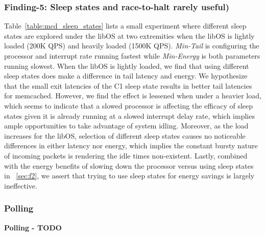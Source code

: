 \subsubsection{Finding-5: Sleep states and race-to-halt rarely useful)} \label{sec:f5} 
Table~\ref{table:mcd_sleep_states} lists a small experiment where different sleep states are explored under the libOS at two extremities when the libOS is lightly loaded (200K QPS) and heavily loaded (1500K QPS). \textit{Min-Tail} is configuring the processor and interrupt rate running fastest while \textit{Min-Energy} is both parameters running slowest. When the libOS is lightly loaded, we find that using different sleep states does make a difference in tail latency and energy. We hypothesize that the small exit latencies of the C1 sleep state results in better tail latencies for memcached. However, we find the effect is lessened when under a heavier load, which seems to indicate that a slowed processor is affecting the efficacy of sleep states given it is already running at a slowed interrupt delay rate, which implies ample opportunities to take advantage of system idling. Moreover, as the load increases for the libOS, selection of different sleep states causes no noticeable differences in either latency nor energy, which implies the constant bursty nature of incoming packets is rendering the idle times non-existent. Lastly, combined with the energy benefits of slowing down the processor versus using sleep states in ~\ref{sec:f2}, we assert that trying to use sleep states for energy savings is largely ineffective. 

\subsubsection{Polling}
\textbf{Polling - TODO}
